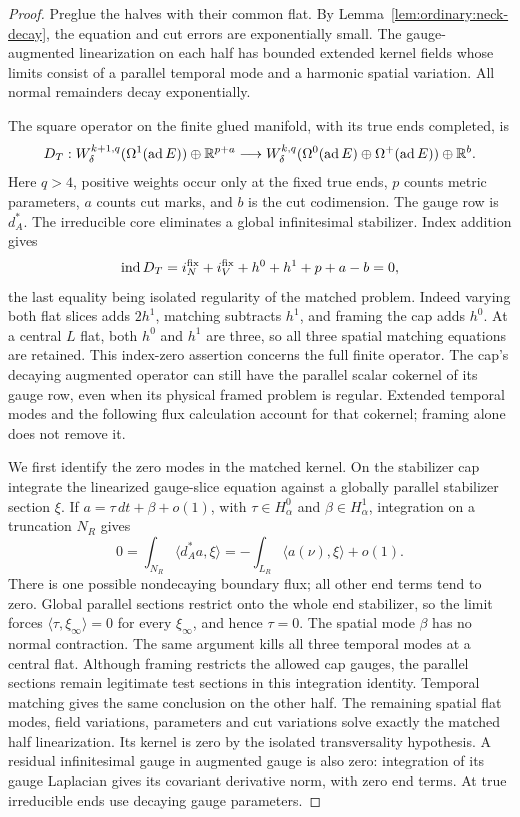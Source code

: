 \begin{proof}
Preglue the halves with their common flat.  By
Lemma~\ref{lem:ordinary:neck-decay}, the equation and cut errors are
exponentially small.  The gauge-augmented linearization on each half
has bounded extended kernel fields whose limits consist of a
parallel temporal mode and a harmonic spatial variation.  All normal
remainders decay exponentially.

The square operator on the finite glued manifold, with its true
ends completed, is
\[
 D_T:
 W^{k+1,q}_\delta(\Omega^1(\operatorname{ad} E))\oplus\mathbb R^{p+a}
 \longrightarrow
 W^{k,q}_\delta(\Omega^0(\operatorname{ad} E)\oplus\Omega^+(\operatorname{ad} E))
       \oplus\mathbb R^b.
\]
Here $q>4$, positive weights occur only at the fixed true ends,
$p$ counts metric parameters, $a$ counts cut marks, and $b$ is the
cut codimension.  The gauge row is $d_A^*$.  The irreducible core
eliminates a global infinitesimal stabilizer.  Index addition gives
\[
 \operatorname{ind} D_T=i_N^{\rm fix}+i_V^{\rm fix}+h^0+h^1+p+a-b=0,
\]
the last equality being isolated regularity of the matched problem.
Indeed varying both flat slices adds $2h^1$, matching subtracts
$h^1$, and framing the cap adds $h^0$.  At a central $L$ flat,
both $h^0$ and $h^1$ are three, so all three spatial matching
equations are retained.  This index-zero assertion concerns the
full finite operator.  The cap's decaying augmented operator can
still have the parallel scalar cokernel of its gauge row, even
when its physical framed problem is regular.  Extended temporal
modes and the following flux calculation account for that
cokernel; framing alone does not remove it.

We first identify the zero modes in the matched kernel.  On the
stabilizer cap integrate the linearized gauge-slice equation against
a globally parallel stabilizer section $\xi$.  If
$a=\tau\,dt+\beta+o(1)$, with $\tau\in H^0_\alpha$ and
$\beta\in H^1_\alpha$, integration on a truncation $N_R$ gives
\[
 0=\int_{N_R}\langle d_A^*a,\xi\rangle
   =-\int_{L_R}\langle a(\nu),\xi\rangle+o(1).
\]
There is one possible nondecaying boundary flux; all other end
terms tend to zero.  Global parallel sections restrict onto the
whole end stabilizer, so the limit forces
$\langle\tau,\xi_\infty\rangle=0$ for every $\xi_\infty$, and
hence $\tau=0$.  The spatial mode $\beta$ has no normal contraction.
The same argument kills all three temporal modes at a central
flat.  Although framing restricts the allowed cap gauges, the
parallel sections remain legitimate test sections in this
integration identity.  Temporal matching gives the same conclusion on the other
half.  The remaining spatial flat modes, field variations,
parameters and cut variations solve exactly the matched half
linearization.  Its kernel is zero by the isolated transversality
hypothesis.  A residual infinitesimal gauge in augmented gauge is
also zero: integration of its gauge Laplacian gives its covariant
derivative norm, with zero end terms.  At true irreducible ends use
decaying gauge parameters.


\end{proof}
